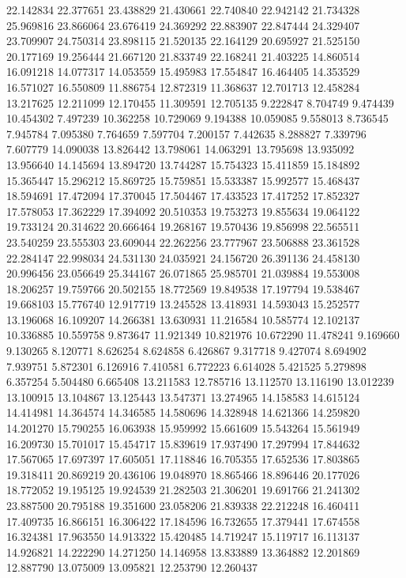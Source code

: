 22.142834
22.377651
23.438829
21.430661
22.740840
22.942142
21.734328
25.969816
23.866064
23.676419
24.369292
22.883907
22.847444
24.329407
23.709907
24.750314
23.898115
21.520135
22.164129
20.695927
21.525150
20.177169
19.256444
21.667120
21.833749
22.168241
21.403225
14.860514
16.091218
14.077317
14.053559
15.495983
17.554847
16.464405
14.353529
16.571027
16.550809
11.886754
12.872319
11.368637
12.701713
12.458284
13.217625
12.211099
12.170455
11.309591
12.705135
9.222847
8.704749
9.474439
10.454302
7.497239
10.362258
10.729069
9.194388
10.059085
9.558013
8.736545
7.945784
7.095380
7.764659
7.597704
7.200157
7.442635
8.288827
7.339796
7.607779
14.090038
13.826442
13.798061
14.063291
13.795698
13.935092
13.956640
14.145694
13.894720
13.744287
15.754323
15.411859
15.184892
15.365447
15.296212
15.869725
15.759851
15.533387
15.992577
15.468437
18.594691
17.472094
17.370045
17.504467
17.433523
17.417252
17.852327
17.578053
17.362229
17.394092
20.510353
19.753273
19.855634
19.064122
19.733124
20.314622
20.666464
19.268167
19.570436
19.856998
22.565511
23.540259
23.555303
23.609044
22.262256
23.777967
23.506888
23.361528
22.284147
22.998034
24.531130
24.035921
24.156720
26.391136
24.458130
20.996456
23.056649
25.344167
26.071865
25.985701
21.039884
19.553008
18.206257
19.759766
20.502155
18.772569
19.849538
17.197794
19.538467
19.668103
15.776740
12.917719
13.245528
13.418931
14.593043
15.252577
13.196068
16.109207
14.266381
13.630931
11.216584
10.585774
12.102137
10.336885
10.559758
9.873647
11.921349
10.821976
10.672290
11.478241
9.169660
9.130265
8.120771
8.626254
8.624858
6.426867
9.317718
9.427074
8.694902
7.939751
5.872301
6.126916
7.410581
6.772223
6.614028
5.421525
5.279898
6.357254
5.504480
6.665408
13.211583
12.785716
13.112570
13.116190
13.012239
13.100915
13.104867
13.125443
13.547371
13.274965
14.158583
14.615124
14.414981
14.364574
14.346585
14.580696
14.328948
14.621366
14.259820
14.201270
15.790255
16.063938
15.959992
15.661609
15.543264
15.561949
16.209730
15.701017
15.454717
15.839619
17.937490
17.297994
17.844632
17.567065
17.697397
17.605051
17.118846
16.705355
17.652536
17.803865
19.318411
20.869219
20.436106
19.048970
18.865466
18.896446
20.177026
18.772052
19.195125
19.924539
21.282503
21.306201
19.691766
21.241302
23.887500
20.795188
19.351600
23.058206
21.839338
22.212248
16.460411
17.409735
16.866151
16.306422
17.184596
16.732655
17.379441
17.674558
16.324381
17.963550
14.913322
15.420485
14.719247
15.119717
16.113137
14.926821
14.222290
14.271250
14.146958
13.833889
13.364882
12.201869
12.887790
13.075009
13.095821
12.253790
12.260437
